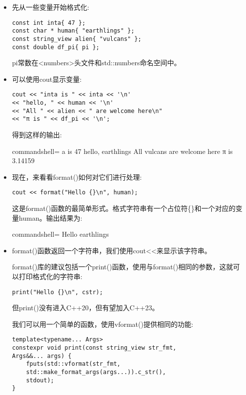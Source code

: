 \begin{itemize}
\item 
先从一些变量开始格式化:

\begin{lstlisting}[style=styleCXX]
const int inta{ 47 };
const char * human{ "earthlings" };
const string_view alien{ "vulcans" };
const double df_pi{ pi };
\end{lstlisting}

pi常数在<numbers>头文件和std::numbers命名空间中。

\item 
可以使用cout显示变量:

\begin{lstlisting}[style=styleCXX]
cout << "inta is " << inta << '\n'
<< "hello, " << human << '\n'
<< "All " << alien << " are welcome here\n"
<< "π is " << df_pi << '\n';
\end{lstlisting}

得到这样的输出:

\begin{tcblisting}{commandshell={}}
a is 47
hello, earthlings
All vulcans are welcome here
π is 3.14159
\end{tcblisting}

\item 
现在，来看看format()如何对它们进行处理:

\begin{lstlisting}[style=styleCXX]
cout << format("Hello {}\n", human);
\end{lstlisting}

这是format()函数的最简单形式。格式字符串有一个占位符\{\}和一个对应的变量human。输出结果为:

\begin{tcblisting}{commandshell={}}
Hello earthlings
\end{tcblisting}

\item 
format()函数返回一个字符串，我们使用cout<{}<来显示该字符串。

format()库的建议包括一个print()函数，使用与format()相同的参数，这就可以打印格式化的字符串:

\begin{lstlisting}[style=styleCXX]
print("Hello {}\n", cstr);
\end{lstlisting}

但print()没有进入C++20，但有望加入C++23。

我们可以用一个简单的函数，使用vformat()提供相同的功能:

\begin{lstlisting}[style=styleCXX]
template<typename... Args>
constexpr void print(const string_view str_fmt,
Args&&... args) {
	fputs(std::vformat(str_fmt,
	std::make_format_args(args...)).c_str(),
	stdout);
}
\end{lstlisting}


\end{itemize}
